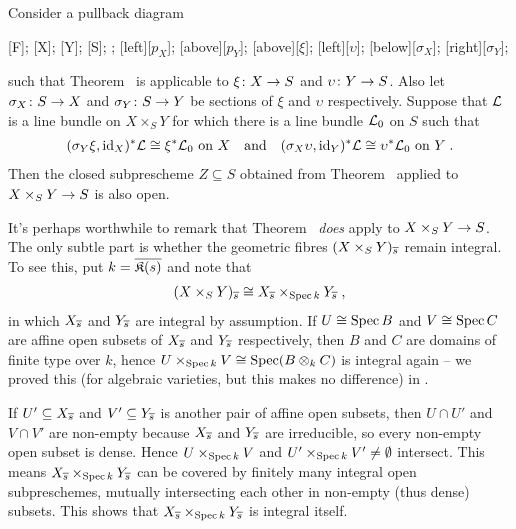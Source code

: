 \documentclass[a4paper,parskip=half,numbers=enddot, DIV=12]{scrreprt}
\begin{document}
\begin{thm}
	Consider a pullback diagram
	\begin{diagram*}
		[F];
		[X];
		[Y];
		[S];
		;
		\scriptsize
		[$p_X$];
		[above][$p_Y$];
		[above][$\xi$];
		[$\upsilon$];
		[below][$\sigma_X$];
		[right][$\sigma_Y$];
	\end{diagram*}
	 such that Theorem~ is applicable to $\xi\colon X\morphism S$ and $\upsilon\colon Y\morphism S$. Also let $\sigma_X\colon S\morphism X$ and $\sigma_Y\colon S\morphism Y$ be sections of $\xi$ and $\upsilon$ respectively. Suppose that $\mathcal{L}$ is a line bundle on $X\times_SY$ for which there is a line bundle $\mathcal{L}_0$ on $S$ such that
	 \begin{align*}
	 	(\sigma_Y\xi,\operatorname{id}_X)^*\mathcal{L}\cong \xi^*\mathcal{L}_0\text{ on }X\quad\text{and}\quad(\sigma_X\upsilon,\operatorname{id}_Y)^*\mathcal{L}\cong \upsilon^*\mathcal{L}_0\text{ on }Y\;.
	 \end{align*}
	 Then the closed subprescheme $Z\subseteq S$ obtained from Theorem~ applied to $X\times_SY\morphism S$ is also open.
\end{thm}
\begin{rem}
	It's perhaps worthwhile to remark that Theorem~ \emph{does} apply to $X\times_SY\morphism S$. The only subtle part is whether the geometric fibres $(X\times_SY)_{\overline{s}}$ remain integral. To see this, put $k=\overline{\mathfrak{K}(s)}$ and note that
	\begin{align*}
		(X\times_SY)_{\overline{s}}\cong X_{\overline{s}}\times_{\operatorname{Spec} k}Y_{\overline{s}}\;,
	\end{align*}
	in which $X_{\overline{s}}$ and $Y_{\overline{s}}$ are integral by assumption. If $U\cong \operatorname{Spec} B$ and $V\cong \operatorname{Spec} C$ are affine open subsets of $X_{\overline{s}}$ and $Y_{\overline{s}}$ respectively, then $B$ and $C$ are domains of finite type over $k$, hence $U\times_{\operatorname{Spec} k}V\cong \operatorname{Spec} (B\otimes_kC)$ is integral again -- we proved this (for algebraic varieties, but this makes no difference) in \cite[Proposition~2.2.6]{alg1}.
	
	If $U'\subseteq X_{\overline{s}}$ and $V'\subseteq Y_{\overline{s}}$ is another pair of affine open subsets, then $U\cap U'$ and $V\cap V'$ are non-empty because $X_{\overline{s}}$ and $Y_{\overline{s}}$ are irreducible, so every non-empty open subset is dense. Hence $U\times_{\operatorname{Spec} k}V$ and $U'\times_{\operatorname{Spec} k}V'\neq \emptyset$ intersect. This means $X_{\overline{s}}\times_{\operatorname{Spec} k}Y_{\overline{s}}$ can be covered by finitely many integral open subpreschemes, mutually intersecting each other in non-empty (thus dense) subsets. This shows that $X_{\overline{s}}\times_{\operatorname{Spec} k}Y_{\overline{s}}$ is integral itself.
\end{rem}
\end{document}
